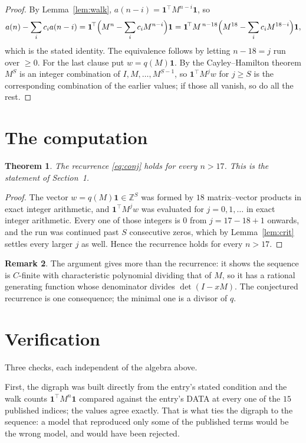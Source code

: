 \documentclass[11pt,a4paper]{article}
\theoremstyle{plain}
\newtheorem{theorem}{Theorem}
\theoremstyle{definition}
\newtheorem{remark}[theorem]{Remark}
\begin{document}
\begin{proof}
By Lemma~\ref{lem:walk}, $a(n-i)=\mathbf{1}^{\!\top}M^{n-i}\mathbf{1}$, so
\[
a(n)-\sum_i c_i a(n-i)
=\mathbf{1}^{\!\top}\Bigl(M^{n}-\sum_i c_i M^{n-i}\Bigr)\mathbf{1}
=\mathbf{1}^{\!\top}M^{\,n-18}\Bigl(M^{18}-\sum_i c_i M^{18-i}\Bigr)\mathbf{1},
\]
which is the stated identity. The equivalence follows by letting $n-18=j$ run over
$\ge0$. For the last clause put $w=q(M)\mathbf{1}$. By the Cayley--Hamilton theorem
$M^{S}$ is an integer combination of $I,M,\dots,M^{S-1}$, so
$\mathbf{1}^{\!\top}M^{j}w$ for $j\ge S$ is the corresponding combination of the
earlier values; if those all vanish, so do all the rest.
\end{proof}

\section{The computation}

\begin{theorem}
The recurrence \eqref{eq:conj} holds for every $n>17$. This is the statement of
Section~1.
\end{theorem}

\begin{proof}
The vector $w=q(M)\mathbf{1}\in\mathbb{Z}^{S}$ was formed by $18$ matrix--vector
products in exact integer arithmetic, and $\mathbf{1}^{\!\top}M^{j}w$ was evaluated for
$j=0,1,\dots$ in exact integer arithmetic. Every one of those integers is $0$ from
$j=17-18+1$ onwards, and the run was continued past $S$ consecutive zeros, which by
Lemma~\ref{lem:crit} settles every larger $j$ as well. Hence the recurrence holds for
every $n>17$.
\end{proof}

\begin{remark}
The argument gives more than the recurrence: it shows the sequence is $C$-finite with
characteristic polynomial dividing that of $M$, so it has a rational generating function
whose denominator divides $\det(I-xM)$. The conjectured recurrence is one consequence; the
minimal one is a divisor of $q$.
\end{remark}

\section{Verification}

Three checks, each independent of the algebra above.

First, the digraph was built directly from the entry's stated condition and the walk counts
$\mathbf{1}^{\!\top}M^{n}\mathbf{1}$ compared against the entry's DATA at every one of
the $15$ published indices; the values agree exactly. That is what ties the digraph to
the sequence: a model that reproduced only some of the published terms would be the wrong
model, and would have been rejected.
\end{document}
